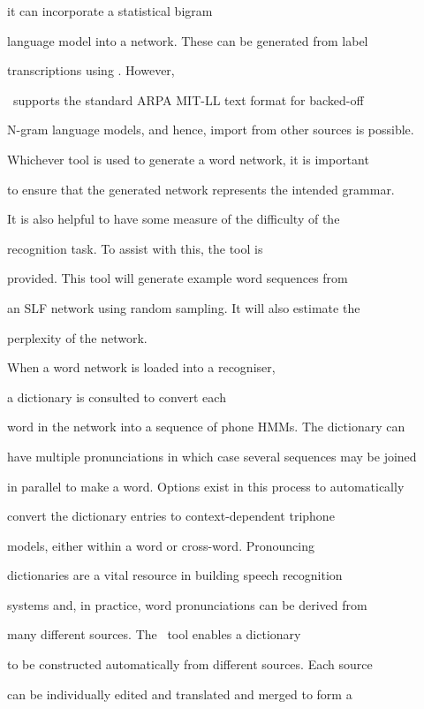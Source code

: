 it can incorporate a statistical bigram


language model into a network.  These can be generated from label


transcriptions using .  However,


\HTK\ supports the standard ARPA MIT-LL text format for backed-off


N-gram language models, and hence, import from other sources is possible.


 


Whichever tool is used to generate a word network, it is important


to ensure that the generated network represents the intended grammar.


It is also helpful to have some measure of the difficulty of the


recognition task.  To assist with this, the tool  is


provided.  This tool will generate example word sequences from


an SLF network using random sampling.  It will also estimate the


perplexity of the network.





When a word network is loaded into a recogniser, 


a dictionary is consulted to convert each


word in the network into a sequence of phone HMMs.   The dictionary can


have multiple pronunciations in which case several sequences may be joined


in parallel to make a word.  Options exist in this process to automatically


convert the dictionary entries to context-dependent triphone


models, either within a word or cross-word.  Pronouncing 


dictionaries are a vital resource in building speech recognition


systems and, in practice, word pronunciations can be derived from


many different sources.  The \HTK\ tool  enables a dictionary


to be constructed automatically from different sources.  Each source


can be individually edited and translated and merged to form a


